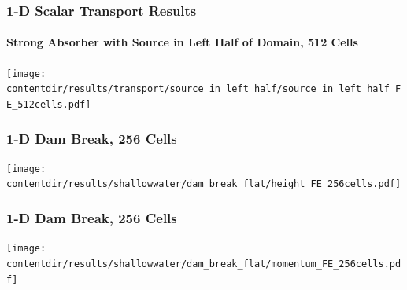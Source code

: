 \documentclass{beamer} \useoutertheme{infolines}
\newcommand{\contentdir}{../../dissertation/content}
\begin{document}
\begin{frame}
\frametitle{1-D Scalar Transport Results}
\framesubtitle{Strong Absorber with Source in Left Half of Domain, 512 Cells}

\begin{center}
   \texttt{[image: \\contentdir/results/transport/source\_in\_left\_half/source\_in\_left\_half\_FE\_512cells.pdf]}
\end{center}

\end{frame}
\begin{frame}
\frametitle{1-D Dam Break, 256 Cells}

\begin{center}
   \texttt{[image: \\contentdir/results/shallowwater/dam\_break\_flat/height\_FE\_256cells.pdf]}
\end{center}

\end{frame}
\begin{frame}
\frametitle{1-D Dam Break, 256 Cells}

\begin{center}
   \texttt{[image: \\contentdir/results/shallowwater/dam\_break\_flat/momentum\_FE\_256cells.pdf]}
\end{center}

\end{frame}
\end{document}
